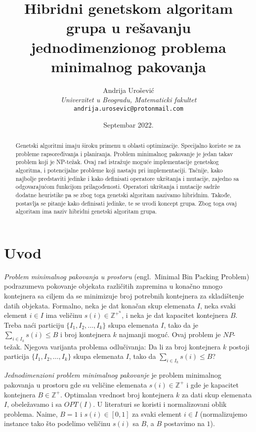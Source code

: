 \documentclass[a4paper,12pt,twocolumn]{article}
\title{Hibridni genetskom algoritam grupa u rešavanju jednodimenzionog problema minimalnog pakovanja}
\author{Andrija Urošević\\\textit{Univerzitet u Beogradu, Matematicki fakultet}\\\texttt{andrija.urosevic@protonmail.com}}
\date{Septembar 2022.}
\begin{document}
\maketitle

\begin{abstract}
    Genetski algoritmi imaju široku primenu u oblasti optimizacije. Specijalno
    koriste se za probleme rapsoređivanja i planiranja. Problem minimalnog 
    pakovanje je jedan takav problem koji je NP-težak. Ovaj rad istražuje 
    moguće implementacije genetskog algoritma, i potencijalne probleme koji 
    nastaju pri implementaciji. Tačnije, kako najbolje predstaviti jedinke
    i kako definisati operatore ukrštanja i mutacije, zajedno sa odgovarajućom
    funkcijom prilagođenosti. Operatori ukrštanja i mutacije sadrže dodatne
    heuristike pa se zbog toga genetski algoritam nazivamo hibridnim. Takođe,
    postavlja se pitanje kako definisati jedinke, te se uvodi koncept grupa.
    Zbog toga ovaj algoritam ima naziv hibridni genetski algoritam grupa.
\end{abstract}

\section{Uvod}

\emph{Problem minimalnog pakovanja u prostoru} 
(engl.\ Minimal Bin Packing Problem) podrazumeva pokovanje objekata 
različitih zapremina u konačno mnogo kontejnera sa ciljem da se minimizuje
broj potrebnih kontejnera za skladištenje datih objekata. Formalno, neka je
dat konačan skup elemenata $I$, neka svaki element $i \in I$ ima veličinu 
$s(i) \in \mathbb{Z}^{+^n}$, i neka je dat kapacitet kontejnera $B$. Treba naći
particiju $\{I_1, I_2, \ldots, I_k\}$ skupa elemenata $I$, tako da je 
$\sum_{i \in I_k} s(i) \leq B$ i broj kontejnera $k$ najmanji moguć. 
Ovaj problem je $NP$-težak\cite{gj80}. Njegova varijanta problema odlučivanja:
Da li za broj kontejnera $k$ postoji particija $\{I_1, I_2, \ldots, I_k\}$
skupa elemenata $I$, tako da $\sum_{i \in I_k} s(i) \leq B$? 

\emph{Jednodimenzioni problem minimalnog pakovanje} je problem minimalnog 
pakovanja u prostoru gde su veličine elemenata $s(i) \in \mathbb{Z}^{+}$ i 
gde je kapacitet kontejnera $B \in \mathbb{Z}^{+}$. Optimalan vrednost broj 
kontejnera $k$ za dati skup elemenata $I$, obeležavamo i sa $OPT(I)$.
U literaturi se koristi i normalizovani oblik problema. Naime, $B = 1$ i
$s(i) \in [0, 1]$ za svaki element $i \in I$ (normalizujemo instance tako što
podelimo veličinu $s(i)$ sa $B$, a $B$ postavimo na $1$). 
\end{document}
